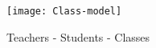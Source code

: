 \documentclass{article}
\newtheorem{example}{Example}
\begin{document}
  
        
  
  \begin{figure}[h!] %
     \centering
     \texttt{[image: Class-model]} 
     \caption{Teachers - Students - Classes}
     \label{fig:university}
  \end{figure}
  
  
% 
  
  
  
  



 
\end{document}
